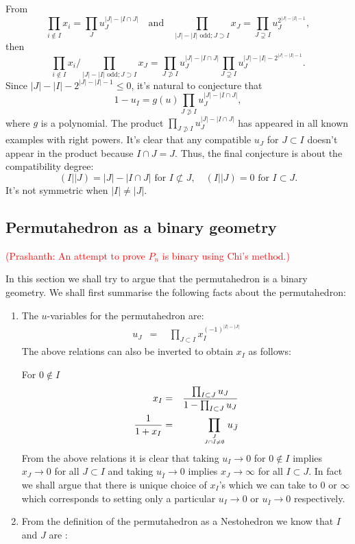 \documentclass[hidelinks,12pt]{article}
\newcommand{\bea}[1]{\begin{eqnarray}\label{#1} }
\newcommand{\eea}{\end{eqnarray}}
\def\bea{\begin{eqnarray}}
\def\eea{\end{eqnarray}}
\begin{document}
\begin{enumerate}
From
\[
\prod_{i\not\in I}x_i=\prod_J u_J^{|J|-|I\cap J|}
\quad\text{and}\quad
\prod_{|J|-|I| \text{ odd}; J\supset I}x_J
=
\prod_{J\supsetneq I}u_J^{2^{|J|-|I|-1}},
\]
then
\[
\prod_{i\not\in I}x_i\bigg/\prod_{|J|-|I| \text{ odd}; J\supset I}x_J
=\prod_{J\not\supset I} u_J^{|J|-|I\cap J|}\prod_{J\supsetneq I} u_J^{|J|-|I|-2^{|J|-|I|-1}}.
\]
Since $|J|-|I|-2^{|J|-|I|-1}\leq 0$, it's natural to conjecture that
\begin{equation}
1-u_I=g(u)\prod_{J\not\supset I} u_J^{|J|-|I\cap J|},
\end{equation}
where $g$ is a polynomial.
The product $\prod_{J\not\supset I} u_J^{|J|-|I\cap J|}$ has appeared in all known examples with right powers. It's clear that any compatible $u_J$ for $J\subset I$ doesn't appear in the product because $I\cap J=J$. Thus, the final conjecture is about the compatibility degree:
\[
(I||J)=|J|-|I\cap J|\text{ for $I\not\subset J$},\quad  (I||J)=0 \text{ for $I\subset J$}.
\]
It's not symmetric when $|I|\neq |J|$.


\subsection{Permutahedron as a binary geometry}

\textcolor{red}{(Prashanth: An attempt to prove $P_n$ is binary using Chi's method.)}

In this section we shall try to argue that the permutahedron is a binary geometry. We shall first summarise the following facts about the permutahedron:
\begin{enumerate}
\item The $u$-variables for the permutahedron are: 
\bea
u_J &=& ~~\prod_{J \subset I} x_I^{(-1)^{|I|-|J|}} \nonumber 
\eea
The above relations can also be inverted to obtain $x_I$ as follows:

For $0 \notin I $
\bea
x_I &=& \frac{\prod_{I \subset J} u_{J}}{1-\prod_{I \subset J} u_{J}} \\
\frac{1}{1+ x_I} &=& \prod_{{J}\atop{J\cap \bar{I} \ne \emptyset}} u_{\bar{J}}
\eea
From the above relations it is clear that taking $u_I \rightarrow 0$ for $0 \notin I$ implies $x_J \rightarrow 0$ for all $J \subset I$ and taking $u_{\bar{I}} \rightarrow 0$ implies $x_J \rightarrow \infty $ for all $I \subset J$.
In fact we shall argue that there is unique choice of $x_I$'s which we can take to $0$ or $\infty$ which corresponds to setting only a particular $u_I \rightarrow 0$ or $u_{\bar{I}} \rightarrow 0$ respectively.
\item From the definition of the permutahedron as a Nestohedron we know that $I$ and $J$ are :


\end{enumerate}
\end{enumerate}
\end{document}
